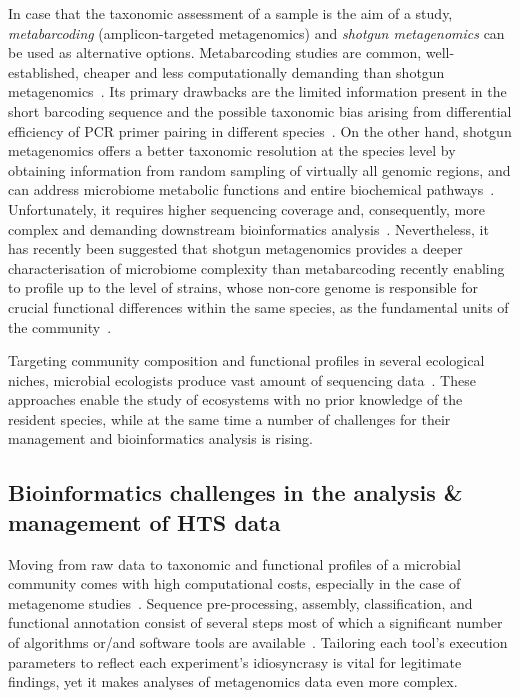       In case that the taxonomic assessment of a sample is the aim of a study, 
      \textit{metabarcoding} (amplicon-targeted metagenomics) and \textit{shotgun metagenomics} can be used as alternative options. 
      Metabarcoding studies are common, well-established, cheaper and less computationally demanding than shotgun metagenomics~\citep{bell2021comparing}. 
      Its primary drawbacks are the limited information present in the short barcoding sequence and the possible taxonomic bias arising from differential efficiency of PCR primer pairing in different species~\citep{blazewicz2013evaluating}. 
      On the other hand, shotgun metagenomics offers a better taxonomic resolution at the species level by obtaining information from random sampling of virtually all genomic regions, and can address microbiome metabolic functions and entire biochemical pathways~\citep{sharpton_introduction_2014}. 
      Unfortunately, it requires higher sequencing coverage and, consequently, more complex and demanding downstream bioinformatics analysis~\citep{laudadio2018quantitative}. 
      Nevertheless, it has recently been suggested that shotgun metagenomics provides a deeper characterisation of microbiome complexity than metabarcoding recently enabling to profile up to the level of strains, whose non-core genome is responsible for crucial functional differences within the same species, 
      as the fundamental units of the community~\citep{davila2019review, clooney_comparing_2016, segata_road_2018}.       
      
      Targeting community composition and functional profiles in several ecological niches, 
      microbial ecologists produce vast 
      amount of sequencing data~\citep{harrison2021european}.
      These approaches enable the study of ecosystems with no prior knowledge of the resident species, 
      while at the same time a number of challenges for their management and bioinformatics analysis is rising. 
   \subsection{Bioinformatics challenges in the analysis \& management of HTS data}
   \label{subsec:hts_chal}

      Moving from raw data to taxonomic and functional profiles of a microbial community comes with high computational costs, especially in the case of metagenome studies~\citep{yang2021review}.
      Sequence pre-processing, assembly, classification, and functional annotation consist of several steps most of which a significant number of algorithms or/and software tools are available~\citep{breitwieser2019review, roumpeka2017review}. 
      Tailoring each tool's execution parameters to reflect each experiment's idiosyncrasy is vital for legitimate findings, yet it makes analyses of metagenomics data even more complex. 

